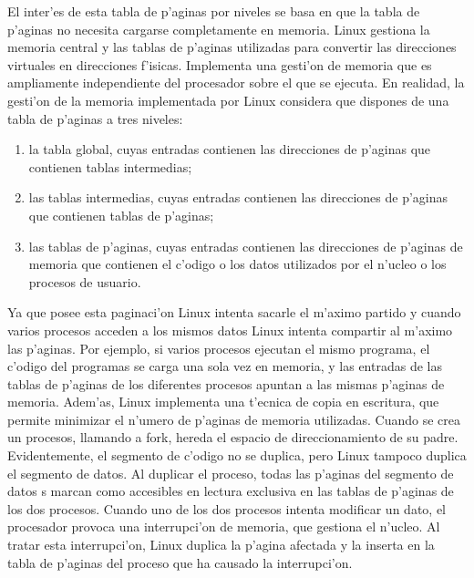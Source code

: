 El inter'es de esta tabla de p'aginas por niveles se basa en que la tabla de p'aginas no necesita cargarse completamente en memoria.
Linux gestiona la memoria central y las tablas de p'aginas utilizadas para convertir las direcciones virtuales en direcciones f'isicas. Implementa una gesti'on de memoria que es ampliamente independiente del procesador sobre el que se ejecuta.
En realidad, la gesti'on de la memoria implementada por Linux considera que dispones de una tabla de p'aginas a tres niveles:

\begin{enumerate}
	\item la tabla global, cuyas entradas contienen las direcciones de p'aginas que contienen tablas intermedias;
	\item las tablas intermedias, cuyas entradas contienen las direcciones de p'aginas que contienen tablas de p'aginas;
	\item las tablas de p'aginas, cuyas entradas contienen las direcciones de p'aginas de memoria que contienen el c'odigo o los datos utilizados por el n'ucleo o los procesos de usuario.
\end{enumerate}

Ya que posee esta paginaci'on Linux intenta sacarle el m'aximo partido y cuando varios procesos acceden a los mismos datos Linux intenta compartir al m'aximo las p'aginas. Por ejemplo, si varios procesos ejecutan el mismo programa, el c'odigo del programas se carga una sola vez en memoria, y las entradas de las tablas de p'aginas de los diferentes procesos apuntan a las mismas p'aginas de memoria.
Adem'as, Linux implementa una t'ecnica de copia en escritura, que permite minimizar el n'umero de p'aginas de memoria utilizadas. Cuando se crea un procesos, llamando a fork, hereda el espacio de direccionamiento de su padre. Evidentemente, el segmento de c'odigo no se duplica, pero Linux tampoco duplica el segmento de datos. Al duplicar el proceso, todas las p'aginas del segmento de datos s marcan como accesibles en lectura exclusiva en las tablas de p'aginas de los dos procesos. Cuando uno de los dos procesos intenta modificar un dato, el procesador provoca una interrupci'on de memoria, que gestiona el n'ucleo. Al tratar esta interrupci'on, Linux duplica la p'agina afectada y la inserta en la tabla de p'aginas del proceso que ha causado la interrupci'on.
